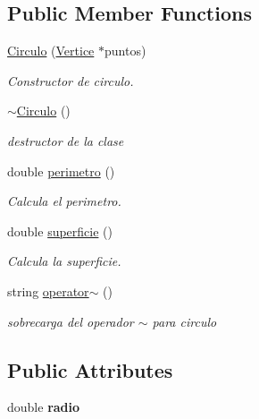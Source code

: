 \subsection*{Public Member Functions}
\begin{DoxyCompactItemize}
\item 
\hyperlink{class_circulo_a790ee75260b927c3b54d534a5d2bab1c}{Circulo} (\hyperlink{class_vertice}{Vertice} $\ast$puntos)
\begin{DoxyCompactList}\small\item\em Constructor de circulo. \end{DoxyCompactList}\item 
\mbox{\label{class_circulo_a8efe39e0e89487519cd802f0738d3bf4}} 
\hyperlink{class_circulo_a8efe39e0e89487519cd802f0738d3bf4}{$\sim$\+Circulo} ()
\begin{DoxyCompactList}\small\item\em destructor de la clase \end{DoxyCompactList}\item 
\mbox{\label{class_circulo_acc35f8fdd7303fca9fe54b0da458bdf2}} 
double \hyperlink{class_circulo_acc35f8fdd7303fca9fe54b0da458bdf2}{perimetro} ()
\begin{DoxyCompactList}\small\item\em Calcula el perimetro. \end{DoxyCompactList}\item 
\mbox{\label{class_circulo_a12314ab6d649a9e6c1300c6950a46ce7}} 
double \hyperlink{class_circulo_a12314ab6d649a9e6c1300c6950a46ce7}{superficie} ()
\begin{DoxyCompactList}\small\item\em Calcula la superficie. \end{DoxyCompactList}\item 
\mbox{\label{class_circulo_ac79dde5c3b5205403a91c694054a3d66}} 
string \hyperlink{class_circulo_ac79dde5c3b5205403a91c694054a3d66}{operator$\sim$} ()
\begin{DoxyCompactList}\small\item\em sobrecarga del operador $\sim$ para circulo \end{DoxyCompactList}\end{DoxyCompactItemize}
\subsection*{Public Attributes}
\begin{DoxyCompactItemize}
\item 
\mbox{\label{class_circulo_aba57029c5768d344c4ef536e5323122b}} 
double {\bfseries radio}
\end{DoxyCompactItemize}
